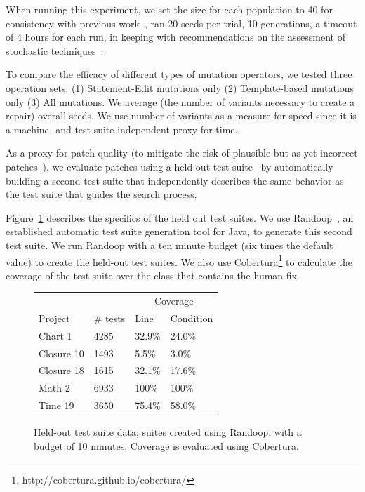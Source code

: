 \documentclass[conference]{IEEEtran}
\begin{document}
When running this experiment, we set the size for each population to 40 for consistency with 
previous work~\cite{legoues12,kim2013}, ran 20
seeds per trial, 10 generations, a timeout of 4 hours for each run, in keeping with 
recommendations on the assessment of stochastic techniques~\cite{arcuri11}.

To compare the efficacy of different types of mutation operators,
we tested three operation sets: (1) Statement-Edit mutations only (2) Template-based mutations 
only (3) All mutations.  We average (the number of variants necessary to create a repair) overall seeds. We use number of variants as a measure for speed since it is a machine- and test suite-independent proxy for time.

As a proxy for patch quality (to
mitigate the risk of plausible but as yet incorrect patches~\cite{Qi15}), we
evaluate patches using a held-out test suite~\cite{legoues2012,smith15} by automatically building a second
test suite that independently describes the same behavior as the test suite that
guides the search process. 

Figure~\ref{heldOut} describes the specifics of the held out test suites. We use Randoop~\cite{pacheco07}, an established
automatic test suite generation tool for Java, to generate this second test
suite. We run Randoop with a ten minute budget (six times the default value) to create the held-out test suites. We also use Cobertura\footnote{http://cobertura.github.io/cobertura/} to calculate the coverage of the test suite over the class that contains the human fix. 

\begin{figure}[]
\centering
\begin{tabular}{llll}
\toprule
         &             & \multicolumn{2}{c}{Coverage} \\
Project & \# tests & Line & Condition \\
\midrule
Chart 1 & 4285 & 32.9\% & 24.0\% \\
Closure 10 & 1493 & 5.5\% & 3.0\% \\
Closure 18 & 1615 & 32.1\% & 17.6\% \\
Math 2 & 6933 & 100\% & 100\% \\
Time 19 & 3650 & 75.4\% & 58.0\% \\
\bottomrule
\end{tabular}
\caption{Held-out test suite data; suites created using Randoop, with a budget
  of 10 minutes. Coverage is evaluated using Cobertura.}
\label{heldOut}
\end{figure}    
\end{document}
